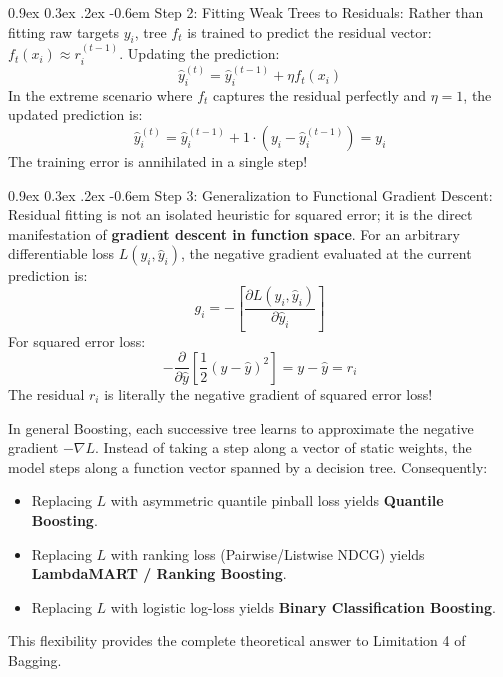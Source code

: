 \documentclass[11pt,a4paper]{article}
\makeatletter
\renewcommand\paragraph{\@startsection{paragraph}{4}{\z@}%
                                     {0.9ex \@plus0.3ex \@minus.2ex}%
                                     {-0.6em}%
                                     {\normalfont\normalsize\bfseries}}
\makeatother
\begin{document}
\paragraph{Step 2: Fitting Weak Trees to Residuals:}
Rather than fitting raw targets $y_i$, tree $f_t$ is trained to predict the residual vector: $f_t(x_i) \approx r_i^{(t-1)}$. Updating the prediction:
\begin{equation}
    \hat{y}_i^{(t)} = \hat{y}_i^{(t-1)} + \eta f_t(x_i)
\end{equation}
In the extreme scenario where $f_t$ captures the residual perfectly and $\eta = 1$, the updated prediction is:
\begin{equation}
    \hat{y}_i^{(t)} = \hat{y}_i^{(t-1)} + 1 \cdot (y_i - \hat{y}_i^{(t-1)}) = y_i
\end{equation}
The training error is annihilated in a single step!

\paragraph{Step 3: Generalization to Functional Gradient Descent:}
Residual fitting is not an isolated heuristic for squared error; it is the direct manifestation of \textbf{gradient descent in function space}. For an arbitrary differentiable loss $L(y_i, \hat{y}_i)$, the negative gradient evaluated at the current prediction is:
\begin{equation}
    g_i = -\left[ \frac{\partial L(y_i, \hat{y}_i)}{\partial \hat{y}_i} \right]
\end{equation}
For squared error loss:
\begin{equation}
    -\frac{\partial}{\partial \hat{y}} \left[ \frac{1}{2}(y - \hat{y})^2 \right] = y - \hat{y} = r_i
\end{equation}
The residual $r_i$ is literally the negative gradient of squared error loss! 

In general Boosting, each successive tree learns to approximate the negative gradient $-\nabla L$. Instead of taking a step along a vector of static weights, the model steps along a function vector spanned by a decision tree. Consequently:
\begin{itemize}
    \item Replacing $L$ with asymmetric quantile pinball loss yields \textbf{Quantile Boosting}.
    \item Replacing $L$ with ranking loss (Pairwise/Listwise NDCG) yields \textbf{LambdaMART / Ranking Boosting}.
    \item Replacing $L$ with logistic log-loss yields \textbf{Binary Classification Boosting}.
\end{itemize}
This flexibility provides the complete theoretical answer to Limitation 4 of Bagging.
\end{document}

